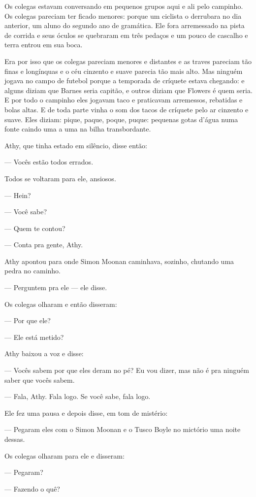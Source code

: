 Os colegas estavam conversando em pequenos grupos aqui e ali pelo
campinho. Os colegas pareciam ter ficado menores: porque um ciclista o
derrubara no dia anterior, um aluno do segundo ano de gramática. Ele
fora arremessado na pista de corrida e seus óculos se quebraram em três
pedaços e um pouco de cascalho e terra entrou em sua boca.

Era por isso que os colegas pareciam menores e distantes e as traves
pareciam tão finas e longínquas e o céu cinzento e suave parecia tão
mais alto. Mas ninguém jogava no campo de futebol porque a temporada de
críquete estava chegando: e alguns diziam que Barnes seria capitão, e
outros diziam que Flowers é quem seria. E por todo o campinho eles
jogavam taco e praticavam arremessos, rebatidas e bolas altas. E de
toda parte vinha o som dos tacos de críquete pelo ar cinzento e suave.
Eles diziam: pique, paque, poque, puque: pequenas gotas d’água numa
fonte caindo uma a uma na bilha transbordante.

Athy, que tinha estado em silêncio, disse então:

 --- Vocês estão todos errados.

Todos se voltaram para ele, ansiosos.

 --- Hein?

 --- Você sabe?

 --- Quem te contou?

 --- Conta pra gente, Athy.

Athy apontou para onde Simon Moonan caminhava, sozinho, chutando uma
pedra no caminho.

 --- Perguntem pra ele --- ele disse.

Os colegas olharam e então disseram:

 --- Por que ele?

 --- Ele está metido?

Athy baixou a voz e disse:

 --- Vocês sabem por que eles deram no pé? Eu vou dizer, mas não é pra
ninguém saber que vocês sabem.

 --- Fala, Athy. Fala logo. Se você sabe, fala logo.

Ele fez uma pausa e depois disse, em tom de mistério:

 --- Pegaram eles com o Simon Moonan e o Tusco Boyle no mictório uma noite
dessas.

Os colegas olharam para ele e disseram:

 --- Pegaram?

 --- Fazendo o quê?

